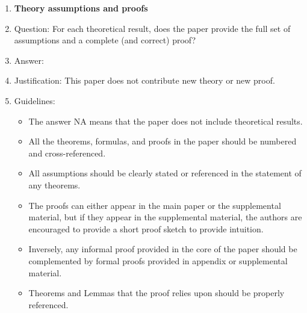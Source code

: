 \documentclass{article}
\begin{document}
\begin{enumerate}
\item {\bf Theory assumptions and proofs}
    \item[] Question: For each theoretical result, does the paper provide the full set of assumptions and a complete (and correct) proof?
    \item[] Answer: \answerNA{} %
    \item[] Justification: This paper does not contribute new theory or new proof.
    \item[] Guidelines:
    \begin{itemize}
        \item The answer NA means that the paper does not include theoretical results. 
        \item All the theorems, formulas, and proofs in the paper should be numbered and cross-referenced.
        \item All assumptions should be clearly stated or referenced in the statement of any theorems.
        \item The proofs can either appear in the main paper or the supplemental material, but if they appear in the supplemental material, the authors are encouraged to provide a short proof sketch to provide intuition. 
        \item Inversely, any informal proof provided in the core of the paper should be complemented by formal proofs provided in appendix or supplemental material.
        \item Theorems and Lemmas that the proof relies upon should be properly referenced. 
    \end{itemize}


\end{enumerate}
\end{document}
